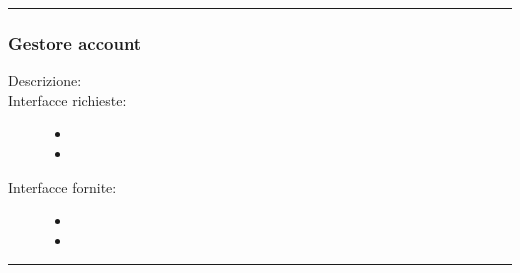 \documentclass[11pt, a4paper]{article}
\theoremstyle{definition} %
\begin{document}
\begin{center}
    \rule{5cm}{1pt}
\end{center}

\subsubsection{Gestore account}
\begin{description}
    \item[Descrizione:]

    \item[Interfacce richieste:]
    \begin{itemize}
        \item[]

        \item
    \end{itemize}

    \item[Interfacce fornite:]
    \begin{itemize}
        \item[]

        \item
    \end{itemize}
\end{description}

\begin{center}
    \rule{5cm}{1pt}
\end{center}
\end{document}
